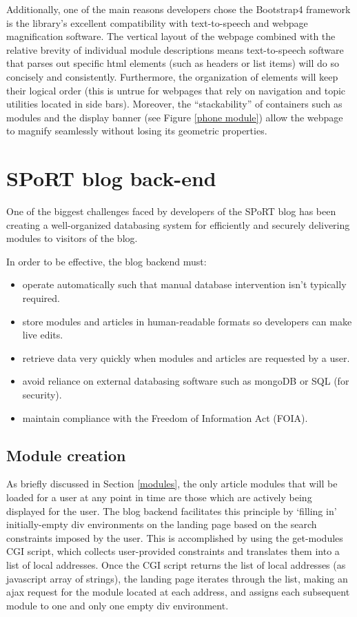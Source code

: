 \documentclass[12pt]{article}
\begin{document}
Additionally, one of the main reasons developers chose the Bootstrap4 framework is the library's excellent compatibility with text-to-speech and webpage magnification software. The vertical layout of the webpage combined with the relative brevity of individual module descriptions means text-to-speech software that parses out specific html elements (such as headers or list items) will do so concisely and consistently. Furthermore, the organization of elements will keep their logical order (this is untrue for webpages that rely on navigation and topic utilities located in side bars). Moreover, the ``stackability'' of containers such as modules and the display banner (see Figure \ref{phone module}) allow the webpage to magnify seamlessly without losing its geometric properties.

\newpage
\section{SPoRT blog back-end}
\label{backend}

One of the biggest challenges faced by developers of the SPoRT blog has been creating a well-organized databasing system for efficiently and securely delivering modules to visitors of the blog.

\noindent
In order to be effective, the blog backend must:
\begin{itemize}
  \item{operate automatically such that manual database intervention isn't typically required.}
  \item{store modules and articles in human-readable formats so developers can make live edits.}
  \item{retrieve data very quickly when modules and articles are requested by a user.}
  \item{avoid reliance on external databasing software such as mongoDB or SQL (for security).}
  \item{maintain compliance with the Freedom of Information Act (FOIA). \cite{foia20}}
\end{itemize}

\subsection{Module creation}
\label{module creation}

As briefly discussed in Section \ref{modules}, the only article modules that will be loaded for a user at any point in time are those which are actively being displayed for the user. The blog backend facilitates this principle by `filling in' initially-empty div environments on the landing page based on the search constraints imposed by the user. This is accomplished by using the get-modules CGI script, which collects user-provided constraints and translates them into a list of local addresses. Once the CGI script returns the list of local addresses (as javascript array of strings), the landing page iterates through the list, making an ajax request for the module located at each address, and assigns each subsequent module to one and only one empty div environment.
\end{document}
